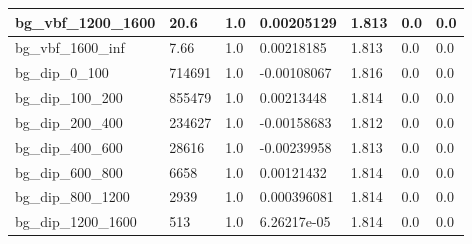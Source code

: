 \documentclass[a4paper, 10pt]{article}
\begin{document}
\begin{table}[H]
\begin{center}
\begin{tabular}{|m{23.0mm}|m{23.0mm}|m{18.0mm}|m{19.0mm}|m{19.0mm}|m{19.0mm}|m{19.0mm}|}
      \hline
      {\cellcolor{white}         bg\_vbf\_1200\_1600}& {\cellcolor{white}         20.6}& {\cellcolor{white}         1.0}& {\cellcolor{white}         0.00205129}& {\cellcolor{white}         1.813}& {\cellcolor{green}         0.0}& {\cellcolor{green}         0.0}\\
      \hline
      {\cellcolor{white}         bg\_vbf\_1600\_inf}& {\cellcolor{white}         7.66}& {\cellcolor{white}         1.0}& {\cellcolor{white}         0.00218185}& {\cellcolor{white}         1.813}& {\cellcolor{green}         0.0}& {\cellcolor{green}         0.0}\\
      \hline
      {\cellcolor{white}         bg\_dip\_0\_100}& {\cellcolor{white}         714691}& {\cellcolor{white}         1.0}& {\cellcolor{white}         -0.00108067}& {\cellcolor{white}         1.816}& {\cellcolor{green}         0.0}& {\cellcolor{green}         0.0}\\
      \hline
      {\cellcolor{white}         bg\_dip\_100\_200}& {\cellcolor{white}         855479}& {\cellcolor{white}         1.0}& {\cellcolor{white}         0.00213448}& {\cellcolor{white}         1.814}& {\cellcolor{green}         0.0}& {\cellcolor{green}         0.0}\\
      \hline
      {\cellcolor{white}         bg\_dip\_200\_400}& {\cellcolor{white}         234627}& {\cellcolor{white}         1.0}& {\cellcolor{white}         -0.00158683}& {\cellcolor{white}         1.812}& {\cellcolor{green}         0.0}& {\cellcolor{green}         0.0}\\
      \hline
      {\cellcolor{white}         bg\_dip\_400\_600}& {\cellcolor{white}         28616}& {\cellcolor{white}         1.0}& {\cellcolor{white}         -0.00239958}& {\cellcolor{white}         1.813}& {\cellcolor{green}         0.0}& {\cellcolor{green}         0.0}\\
      \hline
      {\cellcolor{white}         bg\_dip\_600\_800}& {\cellcolor{white}         6658}& {\cellcolor{white}         1.0}& {\cellcolor{white}         0.00121432}& {\cellcolor{white}         1.814}& {\cellcolor{green}         0.0}& {\cellcolor{green}         0.0}\\
      \hline
      {\cellcolor{white}         bg\_dip\_800\_1200}& {\cellcolor{white}         2939}& {\cellcolor{white}         1.0}& {\cellcolor{white}         0.000396081}& {\cellcolor{white}         1.814}& {\cellcolor{green}         0.0}& {\cellcolor{green}         0.0}\\
      \hline
      {\cellcolor{white}         bg\_dip\_1200\_1600}& {\cellcolor{white}         513}& {\cellcolor{white}         1.0}& {\cellcolor{white}         6.26217e-05}& {\cellcolor{white}         1.814}& {\cellcolor{green}         0.0}& {\cellcolor{green}         0.0}\\

\end{tabular}
\end{center}
\end{table}
\end{document}
